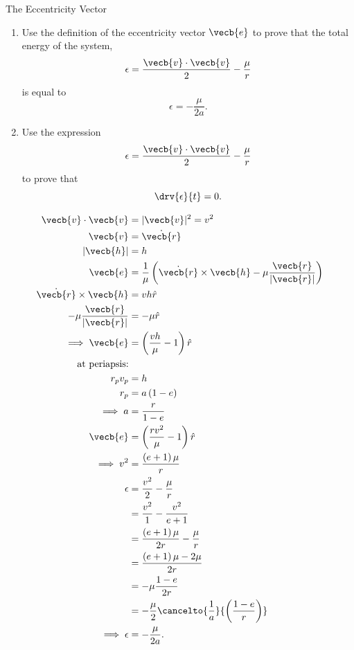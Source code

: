 \begin{hwkProblem}{1}{The Eccentricity Vector} \label{hwk:p01}

	\begin{enumerate}
		\item \label{hwk:p01a} Use the definition of the eccentricity vector \( \vecb{e} \) to prove that the total energy of the system, \[ \epsilon = \frac{\vecb{v} \cdot \vecb{v}}{2} - \frac{\mu}{r} \] is equal to \[ \epsilon = - \frac{\mu}{2 a} .\]
		\item \label{hwk:p01b} Use the expression \[ \epsilon = \frac{\vecb{v} \cdot \vecb{v}}{2} - \frac{\mu}{r} \] to prove that \[ \drv{\epsilon}{t} = 0 .\]
	\end{enumerate}

	\hwkSol{} \label{hwk:s01}

	\hwkPart{} \label{hwk:s01a}

	\begin{align*}
		\vecb{v} \cdot \vecb{v}& = |\vecb{v}|^{2} = v^{2} \\
		\vecb{v} &= \dot{\vecb{r}} \\
		|\vecb{h}| &= h \\
		\vecb{e} &= \frac{1}{\mu} \left(\dot{\vecb{r}} \times \vecb{h} - \mu \frac{\vecb{r}}{|\vecb{r}|} \right) \\
		\dot{\vecb{r}} \times \vecb{h} &= v h \hat{r} \\
		- \mu \frac{\vecb{r}}{|\vecb{r}|} &= - \mu \hat{r} \\
		\implies \vecb{e} &= \left(\frac{v h}{\mu} - 1\right) \hat{r} \\
		\text{at periapsis:} & \, \\
		r_{p} v_{p} &= h \\
		r_{p} &= a \left(1 - e\right) \\
		\implies a &= \frac{r}{1-e} \\
		\vecb{e} &= \left(\frac{r v^{2}}{\mu} - 1\right) \hat{r} \\
		\implies v^{2} &= \frac{\left(e + 1\right)\mu}{r} \\
		\epsilon &= \frac{v^{2}}{2} - \frac{\mu}{r} \\
		\, &= \frac{v^{2}}{1} - \frac{v^{2}}{e + 1} \\
		\, &= \frac{\left(e + 1\right) \mu}{2 r} - \frac{\mu}{r} \\
		\, &= \frac{\left(e + 1\right)\mu - 2 \mu}{2 r} \\
		\, &= - \mu \frac{1 - e}{2 r} \\
		\, &= - \frac{\mu}{2} \cancelto{\frac{1}{a}}{\left(\frac{1 - e}{r}\right)} \\
		\implies \epsilon &= - \frac{\mu}{2 a}
	.\end{align*}


\end{hwkProblem}
